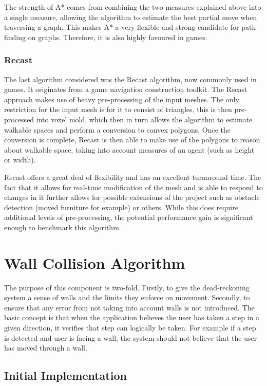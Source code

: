 \documentclass[12pt,a4paper]{report}
\begin{document}
The strength of A* comes from combining the two measures explained above into a single measure, allowing the algorithm to estimate the best partial move when traversing a graph. This makes A* a very flexible and strong candidate for path finding on graphs. Therefore, it is also highly favoured in games.

\subsubsection{Recast}
The last algorithm considered was the Recast\cite{libRecast} algorithm, now commonly used in games. It originates from a game navigation construction toolkit. The Recast approach makes use of heavy pre-processing of the input meshes. The only restriction for the input mesh is for it to consist of triangles, this is then pre-processed into voxel mold, which then in turn allows the algorithm to estimate walkable spaces and perform a conversion to convex polygons. Once the conversion is complete, Recast is then able to make use of the polygons to reason about walkable space, taking into account measures of an agent (such as height or width).
\newline

Recast offers a great deal of flexibility and has an excellent turnaround time. The fact that it allows for real-time modification of the mesh and is able to respond to changes in it further allows for possible extensions of the project such as obstacle detection (moved furniture for example) or others. While this does require additional levels of pre-processing, the potential performance gain is significant enough to benchmark this algorithm.

\section{Wall Collision Algorithm}

The purpose of this component is two-fold. Firstly, to give the dead-reckoning system a sense of walls and the limits they enforce on movement. Secondly, to ensure that any error from not taking into account walls is not introduced. The basic concept is that when the application believes the user has taken a step in a given direction, it verifies that step can logically be taken. For example if a step is detected and user is facing a wall, the system should not believe that the user has moved through a wall.

\subsection{Initial Implementation}
\end{document}
